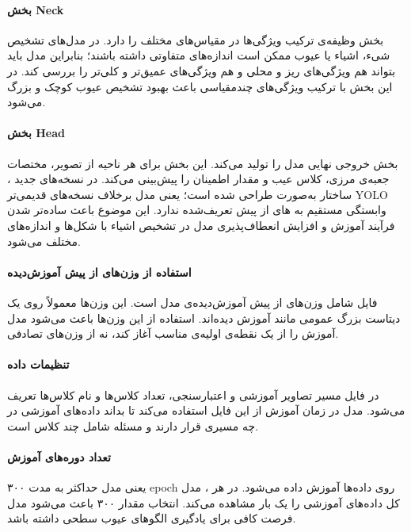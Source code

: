 \documentclass[a4paper, 10pt, twocolumn]{article}
\begin{document}
	\paragraph{بخش Neck}
	بخش  وظیفه‌ی ترکیب ویژگی‌ها در مقیاس‌های مختلف را دارد. در مدل‌های تشخیص شیء، اشیاء یا عیوب ممکن است اندازه‌های متفاوتی داشته باشند؛ بنابراین مدل باید بتواند هم ویژگی‌های ریز و محلی و هم ویژگی‌های عمیق‌تر و کلی‌تر را بررسی کند. در  این بخش با ترکیب ویژگی‌های چندمقیاسی باعث بهبود تشخیص عیوب کوچک و بزرگ می‌شود.
	
	\paragraph{بخش Head}
	بخش  خروجی نهایی مدل را تولید می‌کند. این بخش برای هر ناحیه از تصویر، مختصات جعبه‌ی مرزی، کلاس عیب و مقدار اطمینان را پیش‌بینی می‌کند. در نسخه‌های جدید ، ساختار  به‌صورت  طراحی شده است؛ یعنی مدل برخلاف نسخه‌های قدیمی‌تر YOLO وابستگی مستقیم به های از پیش تعریف‌شده ندارد. این موضوع باعث ساده‌تر شدن فرآیند آموزش و افزایش انعطاف‌پذیری مدل در تشخیص اشیاء با شکل‌ها و اندازه‌های مختلف می‌شود.
	
	\paragraph{استفاده از وزن‌های از پیش آموزش‌دیده}
	
	فایل  شامل وزن‌های از پیش آموزش‌دیده‌ی مدل است. این وزن‌ها معمولاً روی یک دیتاست بزرگ عمومی مانند  آموزش دیده‌اند. استفاده از این وزن‌ها باعث می‌شود مدل آموزش را از یک نقطه‌ی اولیه‌ی مناسب آغاز کند، نه از وزن‌های تصادفی.
	
	\paragraph{تنظیمات داده}
	
	در فایل  مسیر تصاویر آموزشی و اعتبارسنجی، تعداد کلاس‌ها و نام کلاس‌ها تعریف می‌شود. مدل در زمان آموزش از این فایل استفاده می‌کند تا بداند داده‌های آموزشی در چه مسیری قرار دارند و مسئله شامل چند کلاس است.
	
	\paragraph{تعداد دوره‌های آموزش}
	یعنی مدل حداکثر به مدت ۳۰۰ epoch روی داده‌ها آموزش داده می‌شود. در هر ، مدل کل داده‌های آموزشی را یک بار مشاهده می‌کند. انتخاب مقدار ۳۰۰ باعث می‌شود مدل فرصت کافی برای یادگیری الگوهای عیوب سطحی داشته باشد.
	
\end{document}
